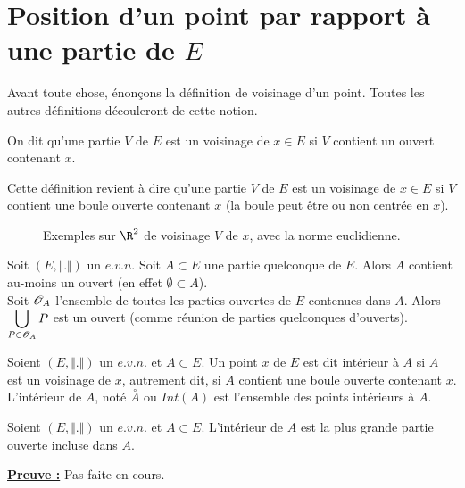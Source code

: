 \documentclass[class=report,crop=false]{standalone}
\begin{document}
\section{Position d'un point par rapport à une partie de $E$}

Avant toute chose, énonçons la définition de voisinage d'un point. Toutes les autres définitions découleront de cette notion.

\begin{definition}[VOISINAGE]
\textcolor[rgb]{0.73,0.00,0.00}{
\noindent On dit qu'une partie $V$ de $E$ est un voisinage de $x \in E$
si $V$ contient un ouvert contenant $x$.
}
\end{definition}

\begin{remarque*}
\textcolor[rgb]{0.00,0.00,1.00}{
\noindent Cette définition revient à dire qu'une partie $V$ de $E$ est un voisinage de $x \in E$
si $V$ contient une boule ouverte contenant $x$ (la boule peut être ou non centrée en $x$).
}
\end{remarque*}

 \begin{figure}[!h]
    \caption{Exemples sur $\R^2$ de voisinage $V$ de $x$, avec la norme euclidienne.}
      \label{fig:voisinage}
\end{figure}

\noindent Soit $(E,\Vert . \Vert)$ un $e.v.n$. Soit $A \subset E$ une partie quelconque de $E$. Alors $A$ contient au-moins
un ouvert (en effet $\emptyset \subset A$). \\
Soit $\mathscr{O}_A$ l'ensemble de toutes les parties ouvertes de $E$ contenues dans $A$.
Alors $\displaystyle \bigcup_{P \in \mathscr{O}_A} P$ est un ouvert (comme réunion de parties quelconques
d'ouverts).



\begin{definition}[INTERIEUR]
\textcolor[rgb]{0.73,0.00,0.00}{
\noindent Soient $(E,\Vert . \Vert)$  un $e.v.n.$ et $A \subset E$. Un point $x$ de $E$ est dit intérieur à $A$ si $A$ est 
un voisinage de $x$, autrement dit, si $A$ contient une boule ouverte contenant $x$. \\
L'intérieur de $A$, noté $\overset{\circ}{A}$ ou $Int(A)$  est l'ensemble des points intérieurs à $A$. 
}
\end{definition}


\begin{proposition}
\textcolor[rgb]{0.50,0.00,0.25}{\vspace{0.1cm}
Soient $(E,\Vert . \Vert)$  un $e.v.n.$ et $A \subset E$. L'intérieur de $A$  est la plus grande partie ouverte 
incluse dans $A$.
}
\end{proposition}
\noindent \underline{\bf Preuve :}
Pas faite en cours.
\end{document}
